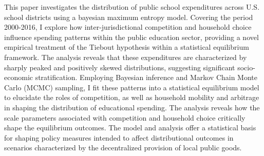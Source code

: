 This paper investigates the distribution of public school expenditures across U.S. school districts using a bayesian maximum entropy model.  Covering the period 2000-2016, I explore how inter-jurisdictional competition and household choice influence spending patterns within the public education sector, providing a novel empirical treatment of the Tiebout hypothesis within a statistical equilibrium framework.  The analysis reveals that these expenditures are characterized by sharply peaked and positively skewed distributions, suggesting significant socio-economic stratification. Employing Bayesian inference and Markov Chain Monte Carlo (MCMC) sampling, I fit these patterns into a statistical equilibrium model to elucidate the roles of competition, as well as household mobility and arbitrage in shaping the distribution of educational spending. The analysis reveals how the scale parameters associated with competition and household choice critically shape the equilibrium outcomes. The model and analysis offer a statistical basis for shaping policy measures intended to affect distributional outcomes in scenarios characterized by the decentralized provision of local public goods.